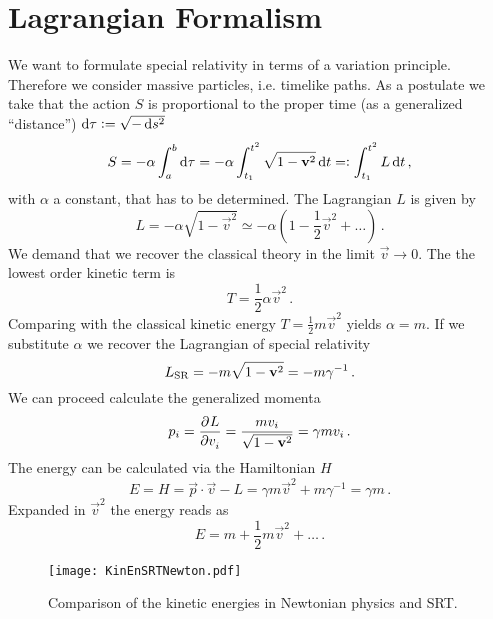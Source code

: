 \section{Lagrangian Formalism}
We want to formulate special relativity in terms of a variation principle.
Therefore we consider massive particles, i.e. timelike paths. As a postulate we
take that the action $S$ is proportional to the proper time (as a generalized
``distance'') $\dif \tau:=\sqrt{-\dif s^2}$
\begin{equation}
    S= -\alpha \int_a^b\dif \tau = -\alpha
    \int_{t_1}^{t^2}\sqrt{1-\vec{v}^2}\dif t =: \int_{t_1}^{t^2}L\dif t\, ,
\end{equation}
with $\alpha$ a constant, that has to be determined. The Lagrangian $L$ is
given by
\begin{equation}
    L=-\alpha\sqrt{1-\vec{v}^2}\simeq
    -\alpha\left(1-\frac{1}{2}\vec{v}^2+\ldots\right) \, .
\end{equation}
We demand that we recover the classical theory in the limit $\vec{v}\to 0$. The
the lowest order kinetic term is
\begin{equation}
    T=\frac{1}{2}\alpha \vec{v}^2\, .
\end{equation}
Comparing with the classical kinetic energy $T=\frac{1}{2}m\vec{v}^2$ yields
$\alpha=m$. If we substitute $\alpha$ we recover the Lagrangian of
special relativity
\begin{equation}
    L\textsubscript{SR}=-m\sqrt{1-\vec{v}^2}=-m\gamma^{-1}\, .
\end{equation}
We can proceed calculate the generalized momenta
\begin{equation}
    p_i=\dpd{L}{v_i}=\frac{mv_i}{\sqrt{1-\vec{v}^2}}=\gamma m v_i\, .
\end{equation}
The energy can be calculated via the Hamiltonian $H$
\begin{equation}
    E=H=\vec{p}\cdot\vec{v}-L=\gamma m \vec{v}^2 + m\gamma^{-1} =\gamma m\, .
\end{equation}
Expanded in $\vec{v}^2$ the energy reads as
\begin{equation}
    E=m+\frac{1}{2}m\vec{v}^2+\ldots\, .
\end{equation}
\begin{figure}[hbtp!]
\centering
 \texttt{[image: KinEnSRTNewton.pdf]}
\caption{Comparison of the kinetic energies in Newtonian physics and SRT.}
\end{figure}

